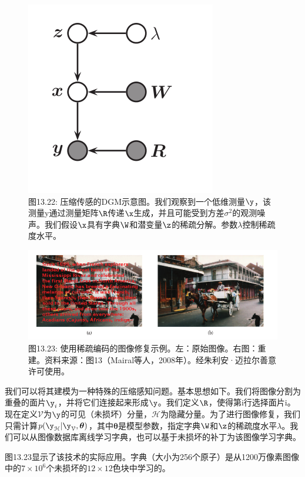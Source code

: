 \documentclass[a4paper]{article}
\begin{document}
\begin{figure}[h]
	\centering
	\includegraphics[width=0.7\linewidth]{fig13/figure22}
	\caption*{图13.22: 压缩传感的DGM示意图。我们观察到一个低维测量$\y$，该测量y通过测量矩阵$\R$传递$\x$生成，并且可能受到方差$\sigma^2$的观测噪声。我们假设$\x$具有字典$\W$和潜变量$\z$的稀疏分解。参数$\lambda$控制稀疏度水平。}
\end{figure}
\begin{figure}[h]
	\centering
	\includegraphics[width=0.7\linewidth]{fig13/figure23}
	\caption*{图13.23: 使用稀疏编码的图像修复示例。左：原始图像。右图：重建。资料来源：图13（Mairal等人，2008年）。经朱利安·迈拉尔善意许可使用。}
\end{figure}

我们可以将其建模为一种特殊的压缩感知问题。基本思想如下。我们将图像分割为重叠的面片$\y_i$，并将它们连接起来形成$\y$。我们定义$\R$，使得第i行选择面片i。现在定义$\mathcal{V}$为$\y$的可见（未损坏）分量，$\mathcal{H}$为隐藏分量。为了进行图像修复，我们只需计算$p(\y_{\mathcal{H}}|\y_{\mathcal{V}},\boldsymbol{\theta})$，其中$\boldsymbol{\theta}$是模型参数，指定字典$\W$和$\z$的稀疏度水平$\lambda$。我们可以从图像数据库离线学习字典，也可以基于未损坏的补丁为该图像学习字典。

图13.23显示了该技术的实际应用。字典（大小为256个原子）是从1200万像素图像中的$7\times 10^6$个未损坏的$12\times 12$色块中学习的。
\end{document}

